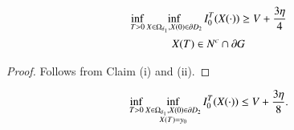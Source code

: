 \begin{claim*}[(iv)]
\begin{gather*}
\inf\limits_{T>0} \inf\limits_{X\in \Omega_{\delta_{1}},X(0)\in \partial
  D_{2}}I^{T}_{0}(X(\cdot))\geq V+\dfrac{3\eta}{4}\\
X(T)\in N^{c}\cap \partial G
\end{gather*}\pageoriginale
\end{claim*}

\begin{proof}
Follows from Claim (i) and (ii).
\end{proof}

\begin{claim*}[(v)]
\begin{gather*}
\inf\limits_{T>0}\inf\limits_{\substack{X\in \Omega_{\delta_{1}},X(0)\in \partial
  D_{2}\\ X(T)=y_{0}}}I^{T}_{0}(X(\cdot))\leq V+\dfrac{3\eta}{8}.
\end{gather*}
\end{claim*}

